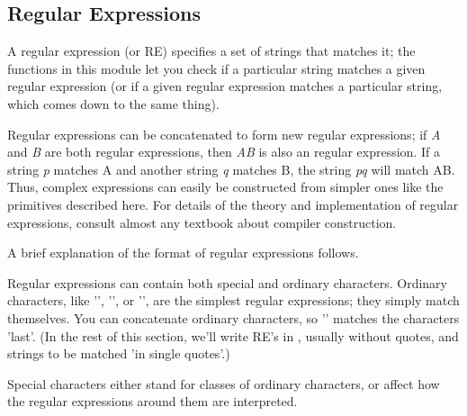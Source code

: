 \subsection{Regular Expressions}

A regular expression (or RE) specifies a set of strings that matches
it; the functions in this module let you check if a particular string
matches a given regular expression (or if a given regular expression
matches a particular string, which comes down to the same thing).

Regular expressions can be concatenated to form new regular
expressions; if \emph{A} and \emph{B} are both regular expressions,
then \emph{AB} is also an regular expression.  If a string \emph{p}
matches A and another string \emph{q} matches B, the string \emph{pq}
will match AB.  Thus, complex expressions can easily be constructed
from simpler ones like the primitives described here.  For details of
the theory and implementation of regular expressions, consult almost
any textbook about compiler construction.


A brief explanation of the format of regular expressions follows.

Regular expressions can contain both special and ordinary characters.
Ordinary characters, like '', '', or '', are
the simplest regular expressions; they simply match themselves.  You
can concatenate ordinary characters, so '' matches the
characters 'last'.  (In the rest of this section, we'll write RE's in
, usually without quotes, and strings to be
matched 'in single quotes'.)

Special characters either stand for classes of ordinary characters, or
affect how the regular expressions around them are interpreted.

